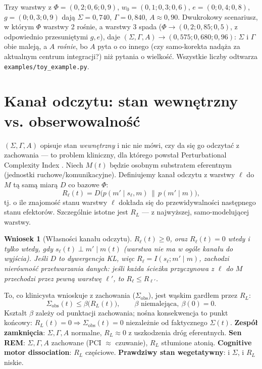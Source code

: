 \documentclass[11pt]{article}
\newtheorem{proposition}{Wniosek}
\begin{document}
Trzy warstwy z $\Phi=(0{,}2;0{,}6;0{,}9)$, $w_0=(0{,}1;0{,}3;0{,}6)$, $e=(0;0{,}4;0{,}8)$, $g=(0;0{,}3;0{,}9)$ dają $\Sigma=0{,}740$, $\Gamma=0{,}840$, $A\approx0{,}90$. Dwukrokowy scenariusz, w którym $\Phi$ warstwy 2 rośnie, a warstwy 3 spada ($\Phi\to(0{,}2;0{,}85;0{,}5)$, z odpowiednio przesuniętymi $g,e$), daje $(\Sigma,\Gamma,A)\to(0{,}575;0{,}680;0{,}96)$: $\Sigma$ i $\Gamma$ obie maleją, a $A$ \emph{rośnie}, bo $A$ pyta o co innego (czy samo-korekta nadąża za aktualnym centrum integracji?) niż pytania o wielkość. Wszystkie liczby odtwarza \texttt{examples/toy\_example.py}.

\section{Kanał odczytu: stan wewnętrzny vs. obserwowalność}\label{sec:readout}

$(\Sigma,\Gamma,A)$ opisuje stan \emph{wewnętrzny} i nic nie mówi, czy da się go odczytać z zachowania --- to problem kliniczny, dla którego powstał Perturbational Complexity Index \cite{casali2013}. Niech $M(t)$ będzie osobnym substratem eferentnym (jednostki ruchowe/komunikacyjne). Definiujemy kanał odczytu z warstwy $\ell$ do $M$ tą samą miarą $D$ co bazowe $\Phi$:
\[
R_\ell(t) = D\big(p(m'\mid s_\ell,m)\,\|\,p(m'\mid m)\big),
\]
tj. o ile znajomość stanu warstwy $\ell$ dokłada się do przewidywalności następnego stanu efektorów. Szczególnie istotne jest $R_L$ --- z najwyższej, samo-modelującej warstwy.

\begin{proposition}[Własności kanału odczytu]
$R_\ell(t)\ge0$, oraz $R_\ell(t)=0$ wtedy i tylko wtedy, gdy $s_\ell(t)\perp m'\mid m(t)$ (warstwa nie ma w ogóle kanału do wyjścia). Jeśli $D$ to dywergencja KL, więc $R_\ell=I(s_\ell;m'\mid m)$, zachodzi nierówność przetwarzania danych: jeśli każda ścieżka przyczynowa z $\ell$ do $M$ przechodzi przez pewną warstwę $\ell'$, to $R_\ell\le R_{\ell'}$.
\end{proposition}

To, co klinicysta wnioskuje z zachowania ($\Sigma_{\text{obs}}$), jest wąskim gardłem przez $R_L$:
\[
\Sigma_{\text{obs}}(t) \le \beta\big(R_L(t)\big), \qquad \beta \text{ niemalejąca},\ \beta(0)=0.
\]
Kształt $\beta$ zależy od punktacji zachowania; nośna konsekwencja to punkt końcowy: $R_L(t)=0 \Rightarrow \Sigma_{\text{obs}}(t)=0$ niezależnie od faktycznego $\Sigma(t)$. \textbf{Zespół zamknięcia}: $\Sigma,\Gamma,A$ normalne, $R_L\approx0$ z uszkodzenia dróg eferentnych. \textbf{Sen REM}: $\Sigma,\Gamma,A$ zachowane (PCI $\approx$ czuwanie), $R_L$ stłumione atonią. \textbf{Cognitive motor dissociation}: $R_L$ częściowe. \textbf{Prawdziwy stan wegetatywny}: i $\Sigma$, i $R_L$ niskie.
\end{document}
